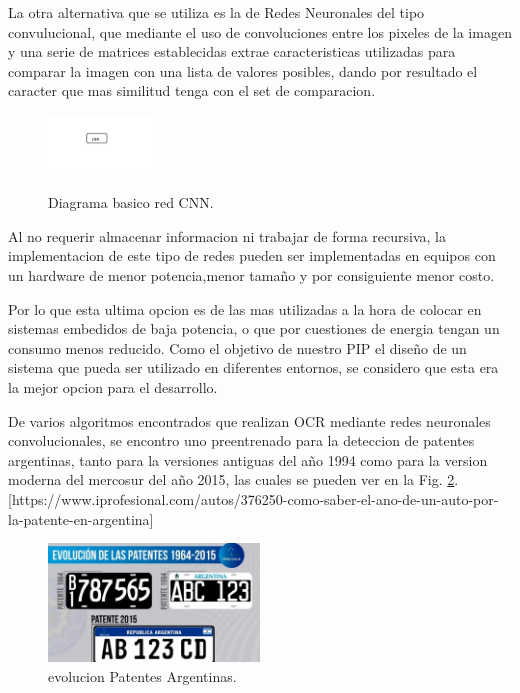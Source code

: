 La otra alternativa que se utiliza es la de Redes Neuronales del tipo convulucional, que mediante
el uso de convoluciones entre los pixeles de la imagen y una serie de matrices establecidas
extrae caracteristicas utilizadas para comparar la imagen con una lista de valores posibles,
dando por resultado el caracter que mas similitud tenga con el set de comparacion.
\begin{figure}[h]
    \centering
    \includegraphics[width=0.25\textwidth]{imgs/CNN-diagrama.jpg}
    \label{fig:diagrama-CNN}
    \caption{Diagrama basico red CNN.}
\end{figure}

Al no requerir almacenar informacion ni trabajar de forma recursiva, la implementacion
de este tipo de redes pueden ser implementadas en equipos con un hardware de menor potencia,menor tamaño y
por consiguiente menor costo.

Por lo que esta ultima opcion es de las mas utilizadas a la hora de colocar en sistemas embedidos de baja
potencia, o que por cuestiones de energia tengan un consumo menos reducido. Como el objetivo de nuestro PIP el diseño
de un sistema que pueda ser utilizado en diferentes entornos, se considero que esta era la mejor opcion para
el desarrollo.

De varios algoritmos encontrados que realizan OCR mediante redes neuronales convolucionales, se encontro uno
preentrenado para la deteccion de patentes argentinas, tanto para la versiones antiguas del año 1994 como para la version moderna del
mercosur del año 2015, las cuales se pueden ver en la Fig. \ref{fig:patentes-arg}. [https://www.iprofesional.com/autos/376250-como-saber-el-ano-de-un-auto-por-la-patente-en-argentina]
\begin{figure}[h]
    \centering
    \includegraphics[width=0.5\textwidth]{imgs/patentes-arg.png}
    \caption{evolucion Patentes Argentinas.}
    \label{fig:patentes-arg}
\end{figure}

